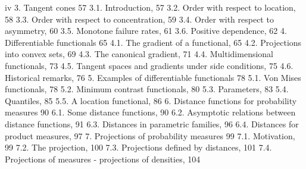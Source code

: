  iv  3. Tangent cones 57  3.1. Introduction, 57  3.2. Order with respect to location, 58  3.3. Order with respect to concentration, 59  3.4. Order with respect to asymmetry, 60  3.5. Monotone failure rates, 61  3.6. Positive dependence, 62  4. Differentiable functionals 65  4.1. The gradient of a functional, 65  4.2. Projections into convex sets, 69  4.3. The canonical gradient, 71  4.4. Multidimensional functionals, 73  4.5. Tangent spaces and gradients under side conditions, 75  4.6. Historical remarks, 76  5. Examples of differentiable functionals 78  5.1. Von Mises functionals, 78  5.2. Minimum contrast functionals, 80  5.3. Parameters, 83  5.4. Quantiles, 85  5.5. A location functional, 86  6. Distance functions for probability measures 90  6.1. Some distance functions, 90  6.2. Asymptotic relations between distance functions, 91  6.3. Distances in parametric families, 96  6.4. Distances for product measures, 97  7. Projections of probability measures 99  7.1. Motivation, 99  7.2. The projection, 100  7.3. Projections defined by distances, 101  7.4. Projections of measures - projections of densities, 104 